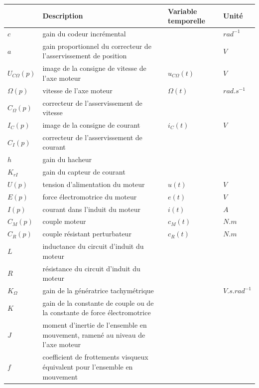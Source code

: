 \clearpage

\begin{tabular}{|p{2cm}|p{9cm}|p{2cm}|p{2cm}|}
\hline
 & \textbf{Description} & \textbf{Variable temporelle} & \textbf{Unité} \\ \hline
$c$ & gain du codeur incrémental & & $rad^{-1}$ \\ \hline
$a$ & gain proportionnel du correcteur de l'asservissement de position & & $V$ \\ \hline
$U_{C\Omega}(p)$ & image de la consigne de vitesse de l'axe moteur & $u_{C\Omega}(t)$ & $V$ \\ \hline
$\Omega(p)$ & vitesse de l'axe moteur & $\Omega(t)$ & $rad.s^{-1}$ \\ \hline
$C_{\Omega}(p)$ & correcteur de l'asservissement de vitesse	& &  \\ \hline
$I_C(p)$ & image de la consigne de courant & $i_C(t)$	& $V$ \\ \hline
$C_I(p)$ & correcteur de l'asservissement de courant & & \\ \hline
$h$ & gain du hacheur & & \\ \hline
$K_{rI}$ & gain du capteur de courant & &  \\ \hline
$U(p)$ & tension d'alimentation du moteur & $u(t)$ & $V$ \\ \hline
$E(p)$ & force électromotrice du moteur	& $e(t)$ & $V$ \\ \hline
$I(p)$ & courant dans l'induit  du moteur & $i(t)$ & $A$ \\ \hline
$C_M(p)$ & couple moteur & $c_M(t)$ & $N.m$ \\ \hline
$C_R(p)$ & couple résistant perturbateur & $c_R(t)$ & $N.m$ \\ \hline
$L$ & inductance du circuit d'induit du moteur & & \\ \hline
$R$ & résistance du circuit d'induit du moteur & & \\ \hline
$K_{\Omega}$ & gain de la génératrice tachymétrique	& & $V.s.rad^{-1}$ \\ \hline
$K$ & gain de la constante de couple ou de la constante de force électromotrice	& &  \\ \hline
$J$ & moment d'inertie  de l'ensemble  en mouvement, ramené  au  niveau  de l'axe moteur & &  \\ \hline
$f$ & coefficient de frottements visqueux équivalent pour l'ensemble en mouvement & &  \\ \hline
\end{tabular}

